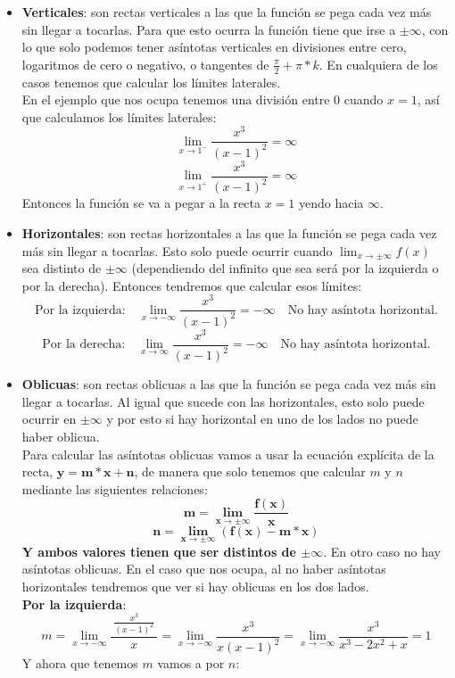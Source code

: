 \documentclass[a4paper,11pt,answers]{exam}
\newcommand\ddfrac[2]{\frac{\displaystyle #1}{\displaystyle #2}}
\begin{document}
\begin{solution}
\begin{enumerate}
	\begin{itemize}
		\item \textbf{Verticales}: son rectas verticales a las que la función se pega cada vez más sin llegar a tocarlas. Para que esto ocurra la función tiene que irse a $\pm\infty$, con lo que solo podemos tener asíntotas verticales en divisiones entre cero, logaritmos de cero o negativo, o tangentes de $\frac{\pi}{2} + \pi *k$. En cualquiera de los casos tenemos que calcular los límites laterales.\\
		En el ejemplo que nos ocupa tenemos una división entre 0 cuando $x=1$, así que calculamos los límites laterales:
		\[\lim_{x \to 1^-}\frac{x^3}{(x - 1)^2} = \infty\]
		\[\lim_{x \to 1^+}\frac{x^3}{(x - 1)^2} = \infty\]
		Entonces la función se va a pegar a la recta $x = 1$ yendo hacia $\infty$.
		\item \textbf{Horizontales}: son rectas horizontales a las que la función se pega cada vez más sin llegar a tocarlas. Esto solo puede ocurrir cuando $\lim_{x \to \pm\infty} f(x)$ sea distinto de $\pm\infty$ (dependiendo del infinito que sea será por la izquierda o por la derecha). Entonces tendremos que calcular esos límites:
		\[\text{Por la izquierda:}\quad\lim_{x \to -\infty} \frac{x^3}{(x - 1)^2} = -\infty\quad\text{No hay asíntota horizontal.}\]
		\[\text{Por la derecha:}\quad\lim_{x \to \infty} \frac{x^3}{(x - 1)^2} = -\infty\quad\text{No hay asíntota horizontal.}\]
		\item \textbf{Oblicuas}: son rectas oblicuas a las que la función se pega cada vez más sin llegar a tocarlas. Al igual que sucede con las horizontales, esto solo puede ocurrir en $\pm\infty$ y por esto si hay horizontal en uno de los lados no puede haber oblicua.\\
	Para calcular las asíntotas oblicuas vamos a usar la ecuación explícita de la recta, $\boldsymbol{y=m*x +n}$, de manera que solo tenemos que calcular $m$ y $n$ mediante las siguientes relaciones:
	\[\boldsymbol{m =\lim_{x \to \pm\infty} \frac{f(x)}{x}}\]
	\[\boldsymbol{n = \lim_{x \to \pm\infty}(f(x) - m*x)}\]
	\textbf{Y ambos valores tienen que ser distintos de $\pm\infty$}. En otro caso no hay asíntotas oblicuas.
	En el caso que nos ocupa, al no haber asíntotas horizontales tendremos que ver si hay oblicuas en los dos lados.\\
	\textbf{Por la izquierda}:
	\[m = \lim_{x \to -\infty} \ddfrac{\ \frac{x^3}{(x -1)^2}\ }{x} =
	\lim_{x \to -\infty} \frac{x^3}{x(x-1)^2} = 
	\lim_{x \to -\infty} \frac{x^3}{x^3 - 2x^2 + x} = 1\]
	Y ahora que tenemos $m$ vamos a por $n$:

\end{itemize}
\end{enumerate}
\end{solution}
\end{document}
